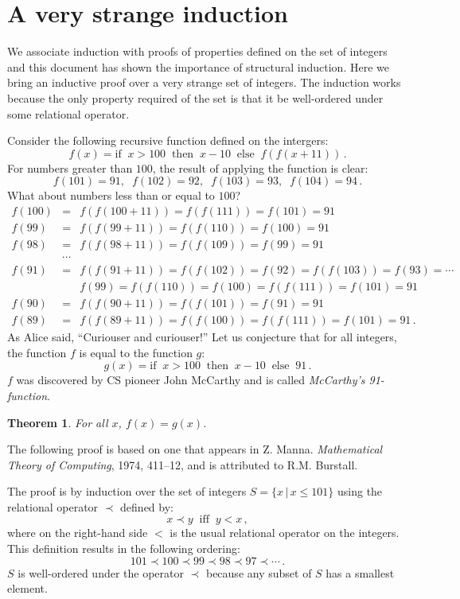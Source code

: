 \documentclass[11pt,a4paper]{report}
\newtheorem{theorem}{Theorem}
\begin{document}
\section{A very strange induction}

We associate induction with proofs of properties defined on the set of integers and this document has shown the importance of structural induction. Here we bring an inductive proof over a very strange set of integers. The induction works because the only property required of the set is that it be well-ordered under some relational operator.

Consider the following recursive function defined on the intergers:
\[
f(x) = \textrm{if}\;\; x > 100 \;\;\textrm{then}\;\; x - 10 \;\;\textrm{else}\;\; f(f(x+11))\,.
\]
For numbers greater than $100$, the result of applying the function is clear:
\[
f(101) = 91, \;\; f(102) = 92,\;\; f(103) = 93,\;\; f(104) = 94\,.
\]
What about numbers less than or equal to $100$?
\begin{eqnarray*}
f(100) &=& f(f(100+11)) = f(f(111)) = f(101) = 91\\
f(99) &=& f(f(99+11)) = f(f(110)) = f(100) = 91\\
f(98) &=& f(f(98+11)) = f(f(109)) = f(99) = 91\\
&\cdots&\\
f(91) &=& f(f(91+11)) = f(f(102)) = f(92) = f(f(103)) = f(93) = \cdots\\
&&f(99) = f(f(110)) = f(100) = f(f(111)) = f(101) = 91\\
f(90) &=& f(f(90+11)) = f(f(101)) = f(91) = 91\\
f(89) &=& f(f(89+11)) = f(f(100)) = f(f(111)) = f(101) = 91\,.
\end{eqnarray*}
As Alice said, ``Curiouser and curiouser!'' Let us conjecture that for all integers, the function $f$ is equal to the function $g$:
\[
g(x) = \textrm{if}\;\; x > 100 \;\;\textrm{then}\;\; x - 10 \;\;\textrm{else}\;\; 91\,.
\]
$f$ was discovered by CS pioneer John McCarthy and is called \emph{McCarthy's 91-function}.

\begin{theorem}
For all $x$, $f(x) = g(x)$.
\end{theorem}

The following proof is based on one that appears in Z. Manna. \textit{Mathematical Theory of Computing}, 1974, 411--12, and is attributed to R.M. Burstall.

The proof is by induction over the set of integers $S=\{x\,|\,x\leq 101\}$ using the relational operator $\prec$ defined by:
\[
x \prec y \;\; \textrm{iff}\;\; y < x\,,
\]
where on the right-hand side $<$ is the usual relational operator on the integers.
This definition results in the following ordering:
\[
101 \prec 100 \prec 99 \prec 98 \prec 97 \prec \cdots\,.
\]
$S$ is well-ordered under the operator $\prec$ because any subset of $S$ has a smallest element.
\end{document}
